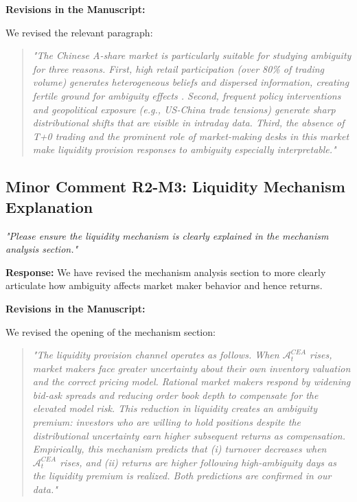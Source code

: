 \documentclass[12pt]{article}
\begin{document}
\begin{highlightbox}
\textbf{Revisions in the Manuscript:}

We revised the relevant paragraph:
\vspace{0.2cm}
\begin{quote}
\itshape "The Chinese A-share market is particularly suitable for studying ambiguity for three reasons. First, high retail participation (over 80\% of trading volume) generates heterogeneous beliefs and dispersed information, creating fertile ground for ambiguity effects \citep{guo2020retail}. Second, frequent policy interventions and geopolitical exposure (e.g., US-China trade tensions) generate sharp distributional shifts that are visible in intraday data. Third, the absence of T+0 trading and the prominent role of market-making desks in this market make liquidity provision responses to ambiguity especially interpretable."
\end{quote}
\end{highlightbox}

\subsection*{Minor Comment R2-M3: Liquidity Mechanism Explanation}
\textit{"Please ensure the liquidity mechanism is clearly explained in the mechanism analysis section."}

\begin{highlightbox}
\textbf{Response:} We have revised the mechanism analysis section to more clearly articulate how ambiguity affects market maker behavior and hence returns.
\end{highlightbox}

\begin{highlightbox}
\textbf{Revisions in the Manuscript:}

We revised the opening of the mechanism section:
\vspace{0.2cm}
\begin{quote}
\itshape "The liquidity provision channel operates as follows. When $\mathcal{A}^{CEA}_t$ rises, market makers face greater uncertainty about their own inventory valuation and the correct pricing model. Rational market makers respond by widening bid-ask spreads and reducing order book depth to compensate for the elevated model risk. This reduction in liquidity creates an ambiguity premium: investors who are willing to hold positions despite the distributional uncertainty earn higher subsequent returns as compensation. Empirically, this mechanism predicts that (i) turnover decreases when $\mathcal{A}^{CEA}_t$ rises, and (ii) returns are higher following high-ambiguity days as the liquidity premium is realized. Both predictions are confirmed in our data."
\end{quote}
\end{highlightbox}
\end{document}
